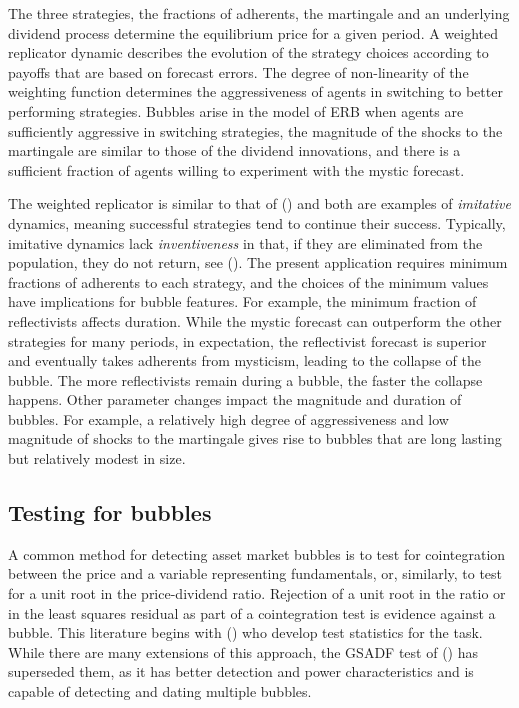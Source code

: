 \documentclass[12pt]{article}
\begin{document}
The three strategies, the fractions of adherents, the martingale and an underlying dividend process determine the equilibrium price for a given period. A weighted replicator dynamic describes the evolution of the strategy choices according to payoffs that are based on forecast errors. The degree of non-linearity of the weighting function determines the aggressiveness of agents in switching to better performing strategies. Bubbles arise in the model of ERB when agents are sufficiently aggressive in switching strategies, the magnitude of the shocks to the martingale are similar to those of the dividend innovations, and there is a sufficient fraction of agents willing to experiment with the mystic forecast. 

The weighted replicator is similar to that of \citeauthor{hofbauer1996evolutionary} (\citeyear{hofbauer1996evolutionary}) and both are examples of \textit{imitative} dynamics, meaning successful strategies tend to continue their success. Typically, imitative dynamics lack \textit{inventiveness} in that, if they are eliminated from the population, they do not return, see \citeauthor{sandholm2011population} (\citeyear{sandholm2011population}). The present application requires minimum fractions of adherents to each strategy, and the choices of the minimum values have implications for bubble features. For example, the minimum fraction of reflectivists affects duration. While the mystic forecast can outperform the other strategies for many periods, in expectation, the reflectivist forecast is superior and eventually takes adherents from mysticism, leading to the collapse of the bubble. The more reflectivists remain during a bubble, the faster the collapse happens. Other parameter changes impact the magnitude and duration of bubbles. For example, a relatively high degree of aggressiveness and low magnitude of shocks to the martingale gives rise to bubbles that are long lasting but relatively modest in size.

\subsection{Testing for bubbles}

A common method for detecting asset market bubbles is to test for cointegration between the price and a variable representing fundamentals, or, similarly, to test for a unit root in the price-dividend ratio. Rejection of a unit root in the ratio or in the least squares residual as part of a cointegration test is evidence against a bubble. This literature begins with \citeauthor{DibaGrossman1988} (\citeyear{DibaGrossman1988}) who develop test statistics for the task. While there are many extensions of this approach, the GSADF test of \citeauthor{phillips2015testing} (\citeyear{phillips2015testing}) has superseded them, as it has better detection and power characteristics and is capable of detecting and dating multiple bubbles.
\end{document}
